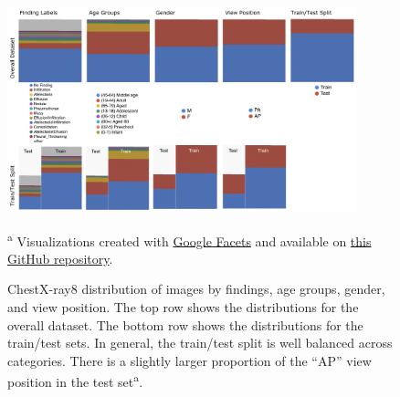 \begin{singlespace}
\begin{figure}[!htb]
    \centering
    \includegraphics[width=0.9\textwidth]{figures/chestX-ray8-overview.png}
    \caption[ChestX-ray8 image distribution by findings, age groups, gender, and view position.]{ChestX-ray8 distribution of images by findings, age groups, gender, and view position. The top row shows the distributions for the overall dataset. The bottom row shows the distributions for the train/test sets. In general, the train/test split is well balanced across categories. There is a slightly larger proportion of the ``AP'' view position in the test set\textsuperscript{a}.}
    \scriptsize\textsuperscript{a} Visualizations created with \href{https://pair-code.github.io/facets/}{Google Facets} and available on \href{https://github.com/fau-masters-collected-works-cgarbin/dataset-visualization-faces-streamlit}{this GitHub repository}.
    \label{fig:chestX-ray8-overview}
\end{figure}


\end{singlespace}
